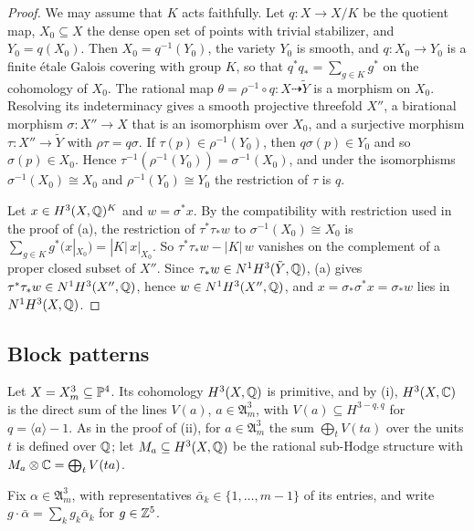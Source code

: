 \begin{proof}
We may assume that $K$ acts faithfully. Let $q\colon X\to X/K$ be the
quotient map, $X_{0}\subseteq X$ the dense open set of points with trivial
stabilizer, and $Y_{0}=q(X_{0})$. Then $X_{0}=q^{-1}(Y_{0})$, the variety
$Y_{0}$ is smooth, and $q\colon X_{0}\to Y_{0}$ is a finite \'etale Galois
covering with group $K$, so that $q^{*}q_{*}=\sum_{g\in K}g^{*}$ on the
cohomology of $X_{0}$. The rational map $\theta=\rho^{-1}\circ q\colon
X\dashrightarrow\tilde Y$ is a morphism on $X_{0}$. Resolving its
indeterminacy \cite{Hir64} gives a smooth projective threefold $X''$, a
birational morphism $\sigma\colon X''\to X$ that is an isomorphism over
$X_{0}$, and a surjective morphism $\tau\colon X''\to\tilde Y$ with
$\rho\tau=q\sigma$. If $\tau(p)\in\rho^{-1}(Y_{0})$, then $q\sigma(p)\in
Y_{0}$ and so $\sigma(p)\in X_{0}$. Hence $\tau^{-1}(\rho^{-1}(Y_{0}))=
\sigma^{-1}(X_{0})$, and under the isomorphisms $\sigma^{-1}(X_{0})\cong
X_{0}$ and $\rho^{-1}(Y_{0})\cong Y_{0}$ the restriction of $\tau$ is $q$.

Let $x\in H^{3}(X,\mathbb{Q})^{K}$ and $w=\sigma^{*}x$. By the compatibility with
restriction used in the proof of (a), the restriction of
$\tau^{*}\tau_{*}w$ to $\sigma^{-1}(X_{0})\cong X_{0}$ is
$\sum_{g\in K}g^{*}(x|_{X_{0}})=|K|\,x|_{X_{0}}$. So $\tau^{*}\tau_{*}w-
|K|\,w$ vanishes on the complement of a proper closed subset of $X''$. Since
$\tau_{*}w\in N^{1}H^{3}(\tilde Y,\mathbb{Q})$, (a) gives
$\tau^{*}\tau_{*}w\in N^{1}H^{3}(X'',\mathbb{Q})$, hence $w\in N^{1}H^{3}(X'',\mathbb{Q})$,
and $x=\sigma_{*}\sigma^{*}x=\sigma_{*}w$ lies in $N^{1}H^{3}(X,\mathbb{Q})$.
\end{proof}

\subsection{Block patterns}
Let $X=X^{3}_{m}\subseteq\mathbb{P}^{4}$. Its cohomology $H^{3}(X,\mathbb{Q})$ is
primitive, and by (i), $H^{3}(X,\mathbb{C})$ is the direct
sum of the lines $V(a)$, $a\in\mathfrak A^{3}_{m}$, with $V(a)\subseteq
H^{3-q,q}$ for $q=\langle a\rangle-1$. As in the proof of
(ii), for $a\in\mathfrak A^{3}_{m}$ the sum
$\bigoplus_{t}V(ta)$ over the units $t$ is defined over $\mathbb{Q}$; let
$M_{a}\subseteq H^{3}(X,\mathbb{Q})$ be the rational sub-Hodge structure with
$M_{a}\otimes\mathbb{C}=\bigoplus_{t}V(ta)$.

Fix $\alpha\in\mathfrak A^{3}_{m}$, with representatives $\bar\alpha_{k}\in
\{1,\dots,m-1\}$ of its entries, and write $g\cdot\bar\alpha=\sum_{k}g_{k}
\bar\alpha_{k}$ for $g\in\mathbb{Z}^{5}$.

